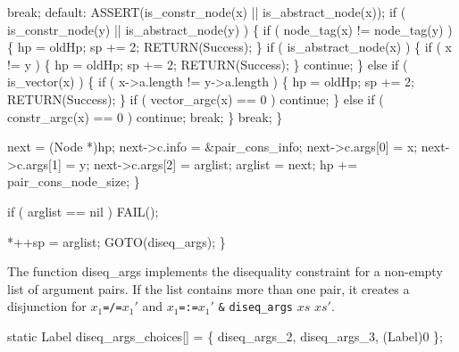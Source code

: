                 break;
            default:
                ASSERT(is_constr_node(x) || is_abstract_node(x));
                if ( is_constr_node(y) || is_abstract_node(y) )
                \{
                    if ( node_tag(x) != node_tag(y) )
                    \{
                        hp  = oldHp;
                        sp += 2;
                        RETURN(Success);
                    \}
                    if ( is_abstract_node(x) )
                    \{
                        if ( x != y )
                        \{
                            hp  = oldHp;
                            sp += 2;
                            RETURN(Success);
                        \}
                        continue;
                    \}
                    else if ( is_vector(x) )
                    \{
                        if ( x->a.length != y->a.length )
                        \{
                            hp  = oldHp;
                            sp += 2;
                            RETURN(Success);
                        \}
                        if ( vector_argc(x) == 0 )
                            continue;
                    \}
                    else if ( constr_argc(x) == 0 )
                        continue;
                    break;
                \}
                break;
            \}

        next            = (Node *)hp;
        next->c.info    = &pair_cons_info;
        next->c.args[0] = x;
        next->c.args[1] = y;
        next->c.args[2] = arglist;
        arglist         = next;
        hp             += pair_cons_node_size;
    \}

    if ( arglist == nil )
        FAIL();

    *++sp = arglist;
    GOTO(diseq_args);
\}

\nwendcode{}\nwdocspar
The function {\Tt{}diseq{\_}args\nwendquote} implements the disequality constraint for
a non-empty list of argument pairs. If the list contains more than one
pair, it creates a disjunction for $x_1$\texttt{=/=}$x_1'$ and               %
$x_1$\texttt{=:=}$x_1'$ \texttt{\&} \texttt{diseq\_args} $xs$ $xs'$.


\nwenddocs{}\plusendmoddef\nwstartdeflinemarkup{}\nwenddeflinemarkup
static Label diseq_args_choices[] = \{ diseq_args_2, diseq_args_3, (Label)0 \};

